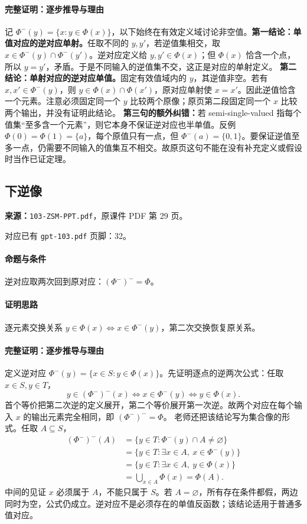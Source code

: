 \paragraph{完整证明：逐步推导与理由}
记 $\Phi^-(y)=\{x:y\in\Phi(x)\}$，以下始终在有效定义域讨论非空值。\textbf{第一结论：单值对应的逆对应单射。}任取不同的 $y,y'$，若逆值集相交，取 $x\in\Phi^-(y)\cap\Phi^-(y')$。逆对应定义给 $y,y'\in\Phi(x)$；但 $\Phi(x)$ 恰含一个点，所以 $y=y'$，矛盾。于是不同输入的逆值集不交，这正是对应的单射定义。
\textbf{第二结论：单射对应的逆对应单值。}固定有效值域内的 $y$，其逆值非空。若有 $x,x'\in\Phi^-(y)$，则 $y\in\Phi(x)\cap\Phi(x')$，原对应单射使 $x=x'$。因此逆值恰含一个元素。注意必须固定同一个 $y$ 比较两个原像；原页第二段固定同一个 $x$ 比较两个输出，并没有证明此结论。
\textbf{第三句的额外纠错：}若 semi-single-valued 指每个值集“至多含一个元素”，则它本身不保证逆对应也半单值。反例 $\Phi(0)=\Phi(1)=\{a\}$，每个原值只有一点，但 $\Phi^-(a)=\{0,1\}$。要保证逆值至多一点，仍需要不同输入的值集互不相交。故原页这句不能在没有补充定义或假设时当作已证定理。
\clearpage\subsection{下逆像}
\textbf{来源：}\texttt{103-ZSM-PPT.pdf}，原课件 PDF 第 29 页。\par
对应已有 \texttt{gpt-103.pdf} 页脚：32。\par
\paragraph{命题与条件}逆对应取两次回到原对应：$(\Phi^-)^-=\Phi$。
\paragraph{证明思路}逐元素交换关系 $y\in\Phi(x)\iff x\in\Phi^-(y)$，第二次交换恢复原关系。
\paragraph{完整证明：逐步推导与理由}

定义逆对应 $\Phi^-(y)=\{x\in S:y\in\Phi(x)\}$。先证明逐点的逆两次公式：任取 $x\in S,y\in T$，
\[y\in(\Phi^-)^-(x)\iff x\in\Phi^-(y)\iff y\in\Phi(x).\]
首个等价把第二次逆的定义展开，第二个等价展开第一次逆。故两个对应在每个输入 $x$ 的输出元素完全相同，即 $(\Phi^-)^-=\Phi$。
老师还把该结论写为集合像的形式。任取 $A\subseteq S$，
\begin{align*}
(\Phi^-)^-(A)
&=\{y\in T:\Phi^-(y)\cap A\ne\varnothing\}\\
&=\{y\in T:\exists x\in A,\ x\in\Phi^-(y)\}\\
&=\{y\in T:\exists x\in A,\ y\in\Phi(x)\}\\
&=\bigcup_{x\in A}\Phi(x)=\Phi(A).
\end{align*}
中间的见证 $x$ 必须属于 $A$，不能只属于 $S$。若 $A=\varnothing$，所有存在条件都假，两边同时为空，公式仍成立。逆对应不是必须存在的单值反函数；该结论适用于普通多值对应。

